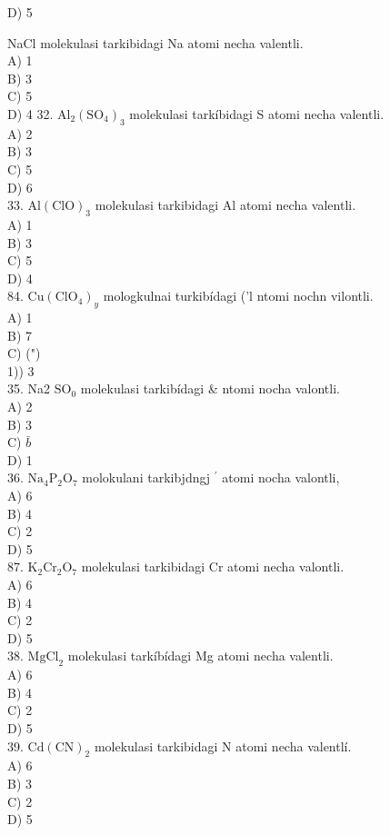 D) 5
  \item NaCl molekulasi tarkibidagi Na atomi necha valentli.\\
A) 1\\
B) 3\\
C) 5\\
D) 4
32. $\mathrm{Al}_{2}\left(\mathrm{SO}_{4}\right)_{3}$ molekulasi tarkíbidagi S atomi necha valentli.\\
A) 2\\
B) 3\\
C) 5\\
D) 6\\
33. $\mathrm{Al}(\mathrm{ClO})_{3}$ molekulasi tarkibidagi Al atomi necha valentli.\\
A) 1\\
B) 3\\
C) 5\\
D) 4\\
84. $\mathrm{Cu}\left(\mathrm{ClO}_{4}\right)_{y}$ mologkulnai turkibídagi ('l ntomi nochn vilontli.\\
A) 1\\
B) 7\\
C) (")\\
1)) 3\\
35. Na2 $\mathrm{SO}_{0}$ molekulasi tarkibídagi \& ntomi nocha valontli.\\
A) 2\\
B) 3\\
C) $\bar{b}$\\
D) 1\\
36. $\mathrm{Na}_{4} \mathrm{P}_{2} \mathrm{O}_{7}$ molokulani tarkibjdngj ${ }^{\prime}$ atomi nocha valontli,\\
A) 6\\
B) 4\\
C) 2\\
D) 5\\
87. $\mathrm{K}_{2} \mathrm{Cr}_{2} \mathrm{O}_{7}$ molekulasi tarkibidagi Cr atomi necha valontli.\\
A) 6\\
B) 4\\
C) 2\\
D) 5\\
38. $\mathrm{MgCl}_{2}$ molekulasi tarkíbídagi Mg atomi necha valentli.\\
A) 6\\
B) 4\\
C) 2\\
D) 5\\
39. $\mathrm{Cd}(\mathrm{CN})_{2}$ molekulasi tarkibidagi N atomi necha valentlí.\\
A) 6\\
B) 3\\
C) 2\\
D) 5

